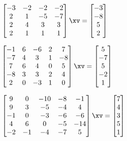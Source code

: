 \begin{exercise}
\begin{Parts}
\item \(\begin{bmatrix} -3&-2&-2&-2
\\2&1&-5&-7
\\2&4&3&3
\\2&1&1&1 \end{bmatrix}\xv
=\begin{bmatrix} -3
\\-8
\\5
\\2 \end{bmatrix}\)
\setbox\ajrqrbox\hbox{}%
\marginajrbox%


\item \(\begin{bmatrix} -1&6&-6&2&7
\\-7&4&3&1&-8
\\7&6&4&0&5
\\-8&3&3&2&4
\\2&0&-3&1&0 \end{bmatrix}\xv
=\begin{bmatrix} 5
\\-7
\\5
\\-2
\\1 \end{bmatrix}\)
\setbox\ajrqrbox\hbox{}%
\marginajrbox%

\begin{OmitV1}
\item \(\begin{bmatrix} 9&0&-10&-8&-1
\\9&3&-5&-4&4
\\-1&0&-3&-6&-6
\\4&6&0&-5&-14
\\-2&-1&-4&-7&5 \end{bmatrix}\xv
=\begin{bmatrix} 7
\\4
\\3
\\5
\\1 \end{bmatrix}\)
\setbox\ajrqrbox\hbox{}%
\marginajrbox%
\end{OmitV1}


\end{Parts}
\end{exercise}



